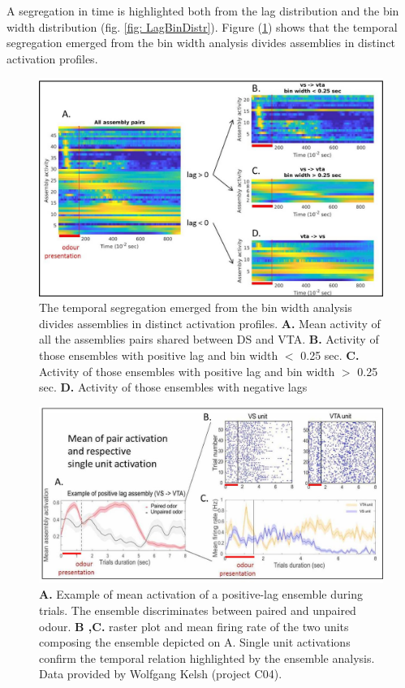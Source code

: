 \documentclass{article}
\begin{document}
A segregation in time is highlighted both from the lag distribution and the bin width distribution (fig. \ref{fig: LagBinDistr}).
Figure (\ref{fig: AssemblyAct}) shows that the temporal segregation emerged from the bin width analysis divides assemblies in distinct activation profiles.
\begin{figure}
    \centering
    \includegraphics[width=1\textwidth]{AssemblyAct}
    \caption{\footnotesize{The temporal segregation emerged from the bin width analysis divides assemblies in distinct activation profiles. \textbf{A.} Mean activity of all the assemblies pairs shared between DS and VTA. \textbf{B.} Activity of those ensembles with positive lag and bin width $<$ 0.25 sec. \textbf{C.} Activity of those ensembles with positive lag and bin width $>$ 0.25 sec. \textbf{D.} Activity of those ensembles with negative lags}}
    \label{fig: AssemblyAct}
\end{figure}
\begin{figure}
    \centering
    \includegraphics[width=1\textwidth]{pairs_and_single}
    \caption{\footnotesize{\textbf{A.} Example of mean activation of a positive-lag ensemble during trials. The ensemble discriminates between paired and unpaired odour. \textbf{B ,C.} raster plot and mean firing rate of the two units composing the ensemble depicted on A. Single unit activations confirm the temporal relation highlighted by the ensemble analysis. Data provided by Wolfgang Kelsh (project C04).}}
    \label{fig: pairs_and_single}
\end{figure}
\end{document}
